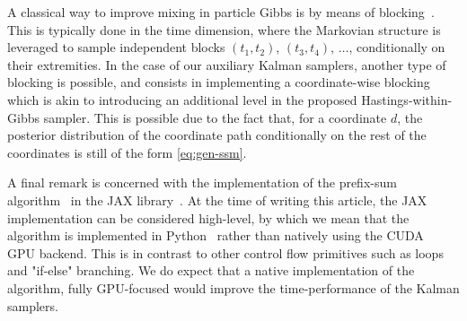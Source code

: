 A classical way to improve mixing in particle Gibbs is by means of blocking~\citep[see, e.g.][]{Singh2017blocking}. This is typically done in the time dimension, where the Markovian structure is leveraged to sample independent blocks $(t_1, t_2)$, $(t_3, t_4)$, $\ldots$, conditionally on their extremities. In the case of our auxiliary Kalman samplers, another type of blocking is possible, and consists in implementing a coordinate-wise blocking which is akin to introducing an additional level in the proposed Hastings-within-Gibbs sampler. This is possible due to the fact that, for a coordinate $d$, the posterior distribution of the coordinate path conditionally on the rest of the coordinates is still of the form \eqref{eq:gen-ssm}.

A final remark is concerned with the implementation of the prefix-sum algorithm~\citet{blelloch1989scans} in the JAX library~\citep{jax2018github}. At the time of writing this article, the JAX implementation can be considered high-level, by which we mean that the algorithm is implemented in Python~\citep{Rossum2009Python} rather than natively using the CUDA~\citep{cuda} GPU backend. This is in contrast to other control flow primitives such as loops and "if-else" branching. We do expect that a native implementation of the algorithm, fully GPU-focused would improve the time-performance of the Kalman samplers. 